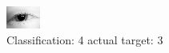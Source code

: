 \begin{figure}[h!]
\begin{center}
\includegraphics[width=0.60\columnwidth]{figures/ID42_class_4_target_3.png}
\end{center}
\caption{ Classification: 4 actual target: 3}
\label{fig:ID42_class_4_target_3}
\end{figure}
